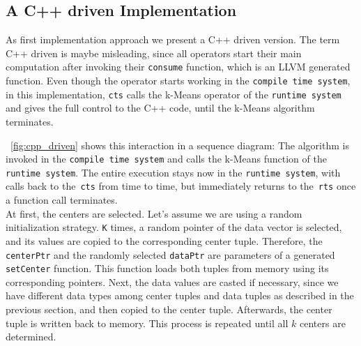 \subsection{A C++ driven Implementation}

As first implementation approach we present a C++ driven version. The term C++ driven is maybe misleading, since all operators start their main computation after invoking their \texttt{consume} function, which is an LLVM generated function. Even though the operator starts working in the \texttt{compile time system}, in this implementation, \texttt{cts} calls the k-Means operator of the \texttt{runtime system} and gives the full control to the C++ code, until the k-Means algorithm terminates. 

~\autoref{fig:cpp_driven} shows this interaction in a sequence diagram: The algorithm is invoked in the \texttt{compile time system} and calls the k-Means function of the \texttt{runtime system}. The entire execution stays now in the \texttt{runtime system}, with calls back to the~\texttt{cts} from time to time, but immediately returns to the~\texttt{rts} once a function call terminates. 
\\
At first, the centers are selected. Let’s assume we are using a random initialization strategy. \texttt{K} times, a random pointer of the data vector is selected, and its values are copied to the corresponding center tuple. Therefore, the \texttt{centerPtr} and the randomly selected \texttt{dataPtr} are parameters of a generated \texttt{setCenter} function. This function loads both tuples from memory using its corresponding pointers. Next, the data values are casted if necessary, since we have different data types among center tuples and data tuples as described in the previous section, and then copied to the center tuple. Afterwards, the center tuple is written back to memory. This process is repeated until all $k$ centers are determined.

